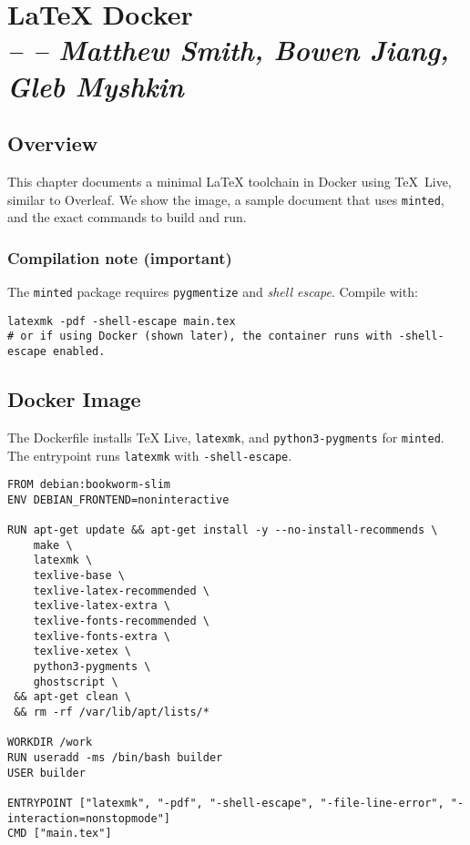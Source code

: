 \chapter[LaTeX Docker]{LaTeX Docker\\
\small\textit{-- -- Matthew Smith, Bowen Jiang, Gleb Myshkin}}
\label{Chapter:LaTeX_Docker}

\section{Overview}
This chapter documents a minimal \LaTeX{} toolchain in Docker using TeX~Live, similar to Overleaf. We show the image, a sample document that uses \texttt{minted}, and the exact commands to build and run.

\subsection*{Compilation note (important)}
The \texttt{minted} package requires \texttt{pygmentize} and \emph{shell escape}. Compile with:
\begin{verbatim}
latexmk -pdf -shell-escape main.tex
# or if using Docker (shown later), the container runs with -shell-escape enabled.
\end{verbatim}

\section{Docker Image}
The Dockerfile installs TeX Live, \texttt{latexmk}, and \texttt{python3-pygments} for \texttt{minted}. The entrypoint runs \texttt{latexmk} with \texttt{-shell-escape}.

\begin{verbatim}
FROM debian:bookworm-slim
ENV DEBIAN_FRONTEND=noninteractive

RUN apt-get update && apt-get install -y --no-install-recommends \
    make \
    latexmk \
    texlive-base \
    texlive-latex-recommended \
    texlive-latex-extra \
    texlive-fonts-recommended \
    texlive-fonts-extra \
    texlive-xetex \
    python3-pygments \
    ghostscript \
 && apt-get clean \
 && rm -rf /var/lib/apt/lists/*

WORKDIR /work
RUN useradd -ms /bin/bash builder
USER builder

ENTRYPOINT ["latexmk", "-pdf", "-shell-escape", "-file-line-error", "-interaction=nonstopmode"]
CMD ["main.tex"]
\end{verbatim}



